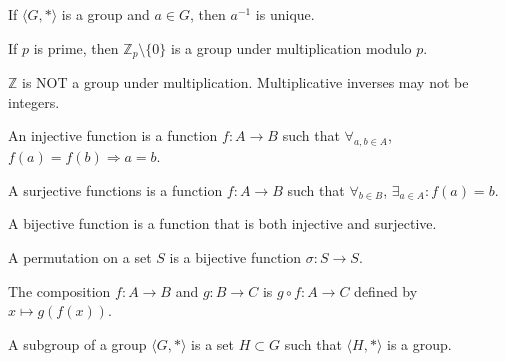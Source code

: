                 \begin{theorem}
                    If $\langle G,*\rangle$ is a group and $a\in G$,
                    then $a^{-1}$ is unique.
                \end{theorem}
                \begin{theorem}
                    If $p$ is prime, then
                    $\mathbb{Z}_p\setminus \{0\}$ is a group
                    under multiplication modulo $p$.
                \end{theorem}
                \begin{remark}
                    $\mathbb{Z}$ is NOT a group under
                    multiplication. Multiplicative inverses may
                    not be integers.
                \end{remark}
                \begin{definition}
                    An injective function is a function
                    $f:A\rightarrow B$ such that
                    $\forall_{a,b\in A}$,
                    $f(a)=f(b)\Rightarrow a=b$.
                \end{definition}
                \begin{definition}
                    A surjective functions is a function
                    $f:A\rightarrow B$ such that
                    $\forall_{b\in B}$,
                    $\exists_{a\in A}:f(a)=b$.
                \end{definition}
                \begin{definition}
                    A bijective function is a function that
                    is both injective and surjective.
                \end{definition}
                \begin{definition}
                    A permutation on a set $S$ is a
                    bijective function $\sigma:S\rightarrow S$.
                \end{definition}
                \begin{definition}
                    The composition $f:A\rightarrow B$ and
                    $g:B\rightarrow C$ is $g\circ f:A\rightarrow C$
                    defined by $x\mapsto g(f(x))$.
                \end{definition}
                \begin{definition}
                    A subgroup of a group $\langle G,*\rangle$ is
                    a set $H\subset G$ such that $\langle H,*\rangle$
                    is a group.
                \end{definition}
